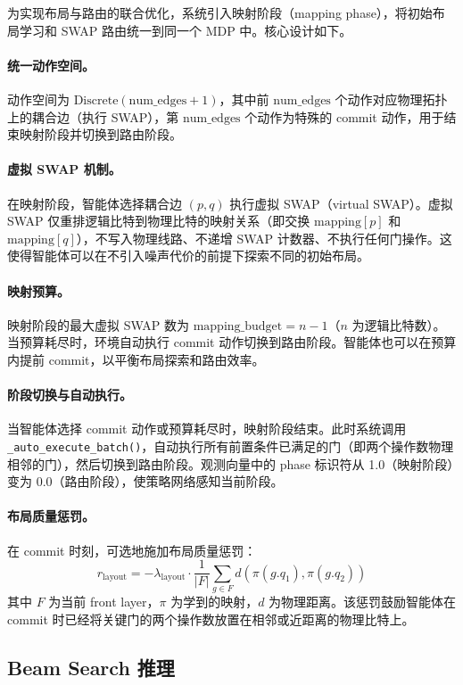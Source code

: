 为实现布局与路由的联合优化，系统引入映射阶段（mapping phase），将初始布局学习和 SWAP 路由统一到同一个 MDP 中。核心设计如下。

\paragraph{统一动作空间。} 动作空间为 $\text{Discrete}(\text{num\_edges} + 1)$，其中前 $\text{num\_edges}$ 个动作对应物理拓扑上的耦合边（执行 SWAP），第 $\text{num\_edges}$ 个动作为特殊的 commit 动作，用于结束映射阶段并切换到路由阶段。

\paragraph{虚拟 SWAP 机制。} 在映射阶段，智能体选择耦合边 $(p, q)$ 执行虚拟 SWAP（virtual SWAP）。虚拟 SWAP 仅重排逻辑比特到物理比特的映射关系（即交换 $\text{mapping}[p]$ 和 $\text{mapping}[q]$），不写入物理线路、不递增 SWAP 计数器、不执行任何门操作。这使得智能体可以在不引入噪声代价的前提下探索不同的初始布局。

\paragraph{映射预算。} 映射阶段的最大虚拟 SWAP 数为 $\text{mapping\_budget} = n - 1$（$n$ 为逻辑比特数）。当预算耗尽时，环境自动执行 commit 动作切换到路由阶段。智能体也可以在预算内提前 commit，以平衡布局探索和路由效率。

\paragraph{阶段切换与自动执行。} 当智能体选择 commit 动作或预算耗尽时，映射阶段结束。此时系统调用 \texttt{\_auto\_execute\_batch()}，自动执行所有前置条件已满足的门（即两个操作数物理相邻的门），然后切换到路由阶段。观测向量中的 phase 标识符从 1.0（映射阶段）变为 0.0（路由阶段），使策略网络感知当前阶段。

\paragraph{布局质量惩罚。} 在 commit 时刻，可选地施加布局质量惩罚：
\[
r_{\text{layout}} = -\lambda_{\text{layout}} \cdot \frac{1}{|F|} \sum_{g \in F} d(\pi(g.q_1), \pi(g.q_2))
\]
其中 $F$ 为当前 front layer，$\pi$ 为学到的映射，$d$ 为物理距离。该惩罚鼓励智能体在 commit 时已经将关键门的两个操作数放置在相邻或近距离的物理比特上。

\subsection{Beam Search 推理}


